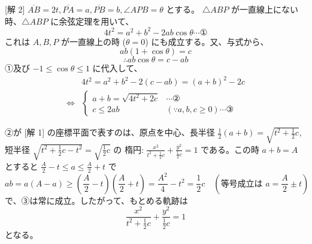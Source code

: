 \documentclass[../main.tex]{subfiles}
\begin{document}
\begin{center}
\end{center}

[解 2] $\overline{AB} = 2t, \overline{PA} = a, \overline{PB} = b, \angle APB = \theta$ とする。
$\triangle ABP$ が一直線上にない時、$\triangle ABP$ に余弦定理を用いて、
$$ 4t^2 = a^2 + b^2 - 2ab \cos \theta \cdots \text{①} $$
これは $A, B, P$ が一直線上の時 ($\theta = 0$) にも成立する。又、与式から、
$$ ab (1 + \cos \theta) = c $$
$$ \therefore ab \cos \theta = c - ab $$
①及び $-1 \le \cos \theta \le 1$ に代入して、
\begin{align*}
  & 4t^2 = a^2 + b^2 - 2(c - ab) = (a + b)^2 - 2c \\
  \iff &
  \begin{cases} a + b = \sqrt{4t^2 + 2c} & \cdots \text{②} \\ c \le 2ab & (\because a, b, c \ge 0) \cdots \text{③}
  \end{cases}
\end{align*}

\begin{center}
\end{center}

②が [解 1] の座標平面で表すのは、原点を中心、長半径 $\frac{1}{2}(a+b) = \sqrt{t^2 + \frac{1}{2} c}$, 短半径 $\sqrt{t^2 + \frac{1}{2} c - t^2} = \sqrt{\frac{1}{2} c}$ の
楕円: $\frac{x^2}{t^2 + \frac{1}{2} c} + \frac{y^2}{\frac{1}{2} c} = 1$ である。この時 $a+b=A$ とすると $\frac{A}{2} - t \le a \le \frac{A}{2} + t$ で
$$ ab = a(A - a) \ge \left( \frac{A}{2} - t \right) \left( \frac{A}{2} + t \right) = \frac{A^2}{4} - t^2 = \frac{1}{2} c \quad (\text{等号成立は } a = \frac{A}{2} \pm t) $$
で、③は常に成立。したがって、もとめる軌跡は
$$ \frac{x^2}{t^2 + \frac{1}{2} c} + \frac{y^2}{\frac{1}{2} c} = 1 $$
となる。
\end{document}
